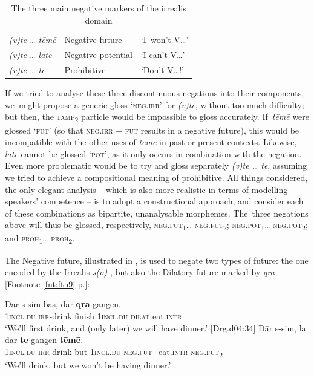 \documentclass[output=paper,colorlinks,citecolor=brown,draft]{langscibook}
\begin{document}
\begin{table}\small
         \begin{tabular}{lll}
            \textit{(v)te … tēmē} & Negative future & ‘I~won’t V…’\\
            \textit{(v)te … late} & Negative potential & ‘I can’t V…’\\
            \textit{(v)te … te} & Prohibitive & ‘Don’t V…!’\\
        \end{tabular}
    \caption{The three main negative markers of the irrealis domain}
    \label{tab:irrealis}
\end{table}

If we tried to analyse these three discontinuous negations into their components, we~might propose a generic gloss ‘\textsc{neg.irr}’ for \textit{(v)te}, without too much difficulty; but then, the \textsc{tamp}\textsubscript{2} particle would be impossible to gloss accurately. If~\textit{tēmē} were glossed ‘\textsc{fut}’ (so that \textsc{neg.irr + fut} results in a negative future), this would be incompatible with the other uses of \textit{tēmē} in past or present contexts. Likewise, \textit{late} cannot be glossed ‘\textsc{pot}’, as it only occurs in combination with the negation. Even more problematic would be to try and gloss separately \textit{(v)te … te}, assum\-ing we tried to achieve a compositional meaning of prohibitive. All things considered, the only elegant analysis -- which is also more realistic in terms of modelling speakers’ competence -- is to adopt a constructional approach, and consider each of these combinations as bipartite, unanalysable morphemes. The~three negations above will thus be glossed, respectively, \textsc{neg.fut\textsubscript{1}}… \textsc{neg.fut\textsubscript{2}}; \textsc{neg.pot\textsubscript{1}}… \textsc{neg.pot\textsubscript{2}}; and \textsc{proh\textsubscript{1}}… \textsc{proh\textsubscript{2}}. 

The Negative future, illustrated in , is used to negate two types of future: the one encoded by the Irrealis \textit{s(o)-}, but also the Dilatory future marked by  \textit{qra} [Footnote \ref{fnt:ftn9} p.\pageref{bkm:Ref130472068}]:


\ea\label{ex:dor:qra}
    \ea\label{ex:dor:qra1}
        \gll  Dār s-sim bas, dār \textbf{qra} gāngēn.\\ 
              \textsc{1incl.du} \textsc{irr}-drink finish \textsc{1incl.du} \textsc{dilat} eat.\textsc{intr}\\
        \glt ‘We’ll first drink, and (only later) we will have dinner.’  {[Drg.d04:34]} %
    \ex\label{ex:dor:qra2}
        \gll  Dār s-sim, la dār \textbf{te} gāngēn \textbf{tēmē}.\\
              \textsc{1incl.du} \textsc{irr}-drink but \textsc{1incl.du} \textsc{neg.fut\textsubscript{1}} eat.\textsc{intr} \textsc{neg.fut\textsubscript{2}}\\
        \glt ‘We’ll drink, but we won’t be having dinner.’ 
    \z
\z 
\end{document}

